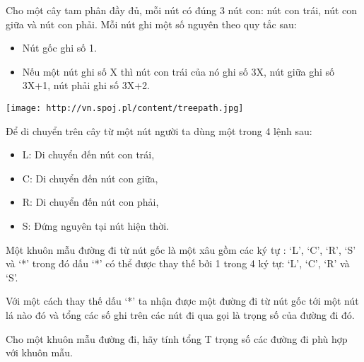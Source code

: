 Cho một cây tam phân đầy đủ, mỗi nút có đúng 3 nút con: nút con trái, nút con giữa và nút con phải. Mỗi nút ghi một số nguyên theo quy tắc sau:  
\begin{itemize}
	\item     Nút gốc ghi số 1.   
	\item     Nếu một nút ghi số X thì nút con trái của nó ghi số 3X, nút giữa ghi số 3X+1, nút phải ghi số 3X+2.   
\end{itemize}
\texttt{[image: http://vn.spoj.pl/content/treepath.jpg]}

   Để di chuyển trên cây từ một nút người ta dùng một trong 4 lệnh sau:  
\begin{itemize}
	\item     L: Di chuyển đến nút con trái,   
	\item     C: Di chuyển đến nút con giữa,   
	\item     R: Di chuyển đến nút con phải,   
	\item     S: Đứng nguyên tại nút hiện thời.   
\end{itemize}

   Một khuôn mẫu đường đi từ nút gốc là một xâu gồm các ký tự : ‘L’, ‘C’, ‘R’, ‘S’ và ‘*’ trong đó dấu ‘*’ có thể được thay thế bởi 1 trong 4 ký tự: ‘L’, ‘C’, ‘R’ và ‘S’.  

   Với một cách thay thế dấu ‘*’ ta nhận được một đường đi từ nút gốc tới một nút lá nào đó và tổng các số ghi trên các nút đi qua gọi là trọng số của đường đi đó.  

Cho một khuôn mẫu đường đi, hãy tính tổng T trọng số các đường đi phù hợp với khuôn mẫu.